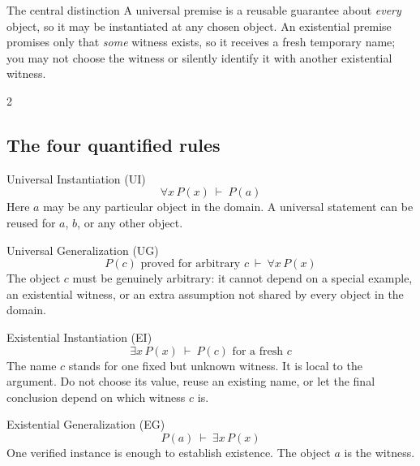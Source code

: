 \documentclass[10pt]{article}
\begin{document}
\begin{checklistbox}{The central distinction}
A universal premise is a reusable guarantee about \emph{every} object, so it
may be instantiated at any chosen object. An existential premise promises only
that \emph{some} witness exists, so it receives a fresh temporary name; you may
not choose the witness or silently identify it with another existential
witness.
\end{checklistbox}

\begin{multicols}{2}
\raggedcolumns
\subsection*{The four quantified rules}

\begin{definitionbox}{Universal Instantiation (UI)}
\[
\forall x\,P(x)\ \vdash\ P(a)
\]
Here $a$ may be any particular object in the domain. A universal statement can
be reused for $a$, $b$, or any other object.
\end{definitionbox}

\begin{definitionbox}{Universal Generalization (UG)}
\[
P(c)\text{ proved for arbitrary }c\ \vdash\ \forall x\,P(x)
\]
The object $c$ must be genuinely arbitrary: it cannot depend on a special
example, an existential witness, or an extra assumption not shared by every
object in the domain.
\end{definitionbox}

\begin{definitionbox}{Existential Instantiation (EI)}
\[
\exists x\,P(x)\ \vdash\ P(c)\text{ for a fresh }c
\]
The name $c$ stands for one fixed but unknown witness. It is local to the
argument. Do not choose its value, reuse an existing name, or let the final
conclusion depend on which witness $c$ is.
\end{definitionbox}

\begin{definitionbox}{Existential Generalization (EG)}
\[
P(a)\ \vdash\ \exists x\,P(x)
\]
One verified instance is enough to establish existence. The object $a$ is the
witness.
\end{definitionbox}


\end{multicols}
\end{document}
